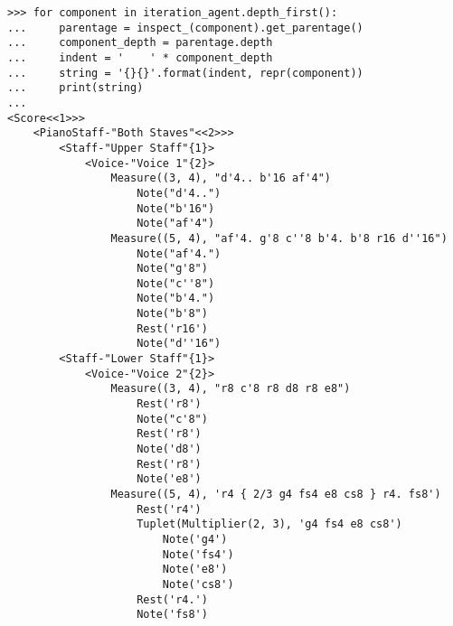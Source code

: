 \begin{comment}
<abjad>
for component in iteration_agent.depth_first():
    parentage = inspect_(component).get_parentage()
    component_depth = parentage.depth
    indent = '    ' * component_depth
    string = '{}{}'.format(indent, repr(component))
    print(string)

</abjad>
\end{comment}

\begin{abjadbookoutput}
\begin{singlespacing}
\vspace{-0.5\baselineskip}
\begin{lstlisting}
>>> for component in iteration_agent.depth_first():
...     parentage = inspect_(component).get_parentage()
...     component_depth = parentage.depth
...     indent = '    ' * component_depth
...     string = '{}{}'.format(indent, repr(component))
...     print(string)
...
<Score<<1>>>
    <PianoStaff-"Both Staves"<<2>>>
        <Staff-"Upper Staff"{1}>
            <Voice-"Voice 1"{2}>
                Measure((3, 4), "d'4.. b'16 af'4")
                    Note("d'4..")
                    Note("b'16")
                    Note("af'4")
                Measure((5, 4), "af'4. g'8 c''8 b'4. b'8 r16 d''16")
                    Note("af'4.")
                    Note("g'8")
                    Note("c''8")
                    Note("b'4.")
                    Note("b'8")
                    Rest('r16')
                    Note("d''16")
        <Staff-"Lower Staff"{1}>
            <Voice-"Voice 2"{2}>
                Measure((3, 4), "r8 c'8 r8 d8 r8 e8")
                    Rest('r8')
                    Note("c'8")
                    Rest('r8')
                    Note('d8')
                    Rest('r8')
                    Note('e8')
                Measure((5, 4), 'r4 { 2/3 g4 fs4 e8 cs8 } r4. fs8')
                    Rest('r4')
                    Tuplet(Multiplier(2, 3), 'g4 fs4 e8 cs8')
                        Note('g4')
                        Note('fs4')
                        Note('e8')
                        Note('cs8')
                    Rest('r4.')
                    Note('fs8')
\end{lstlisting}
\end{singlespacing}
\end{abjadbookoutput}

\begin{comment}
<abjad>
for component in iterate(score).depth_first():
    detached = detach(Markup, component)

iterator = iteration_agent.by_timeline()
for count, leaf in enumerate(iterator, 1):
    string = 'T:{}'.format(count)
    markup = Markup(string, direction=Up)
    markup = markup.pad_around(0.5).box().pad_around(0.25)
    attach(markup, leaf)

show(score)
</abjad>
\end{comment}

